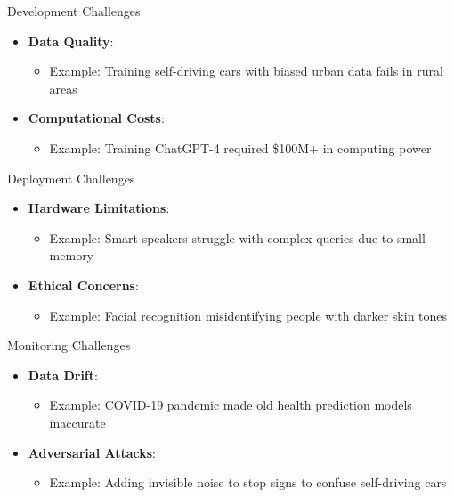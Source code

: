 \documentclass{beamer}
\begin{document}
\begin{frame}{Development Challenges}
\begin{itemize}
\item \textbf{Data Quality}: 
\begin{itemize}
\item Example: Training self-driving cars with biased urban data fails in rural areas
\end{itemize}
\item \textbf{Computational Costs}: 
\begin{itemize}
\item Example: Training ChatGPT-4 required \$100M+ in computing power
\end{itemize}
\end{itemize}
\end{frame}

\begin{frame}{Deployment Challenges}
\begin{itemize}
\item \textbf{Hardware Limitations}: 
\begin{itemize}
\item Example: Smart speakers struggle with complex queries due to small memory
\end{itemize}
\item \textbf{Ethical Concerns}: 
\begin{itemize}
\item Example: Facial recognition misidentifying people with darker skin tones
\end{itemize}
\end{itemize}
\end{frame}

\begin{frame}{Monitoring Challenges}
\begin{itemize}
\item \textbf{Data Drift}: 
\begin{itemize}
\item Example: COVID-19 pandemic made old health prediction models inaccurate
\end{itemize}
\item \textbf{Adversarial Attacks}: 
\begin{itemize}
\item Example: Adding invisible noise to stop signs to confuse self-driving cars
\end{itemize}
\end{itemize}
\end{frame}
\end{document}

